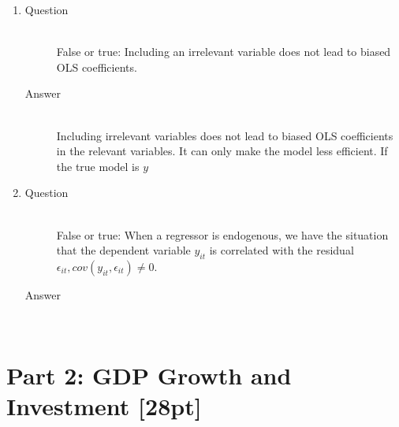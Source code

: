 \documentclass{article}
\begin{document}
\begin{enumerate}
  \item
  \begin{description}
    \item[Question] \hfill \\
    False or true: Including an irrelevant variable does not lead to biased OLS coefficients.
    \item[Answer] \hfill \\
    Including irrelevant variables does not lead to biased OLS coefficients in the relevant variables. It can only make the model less efficient. If the true model is $y$
  \end{description}
  
  \item
  \begin{description}
    \item[Question] \hfill \\
    False or true: When a regressor is endogenous, we have the situation that the dependent variable $y_{it}$ is correlated with the residual $\epsilon_{it},cov(y_{it},\epsilon_{it}) \neq 0$.
    \item[Answer] \hfill \\

  \end{description}
  
\end{enumerate}

\section{Part 2: GDP Growth and Investment [28pt]}
\end{document}
